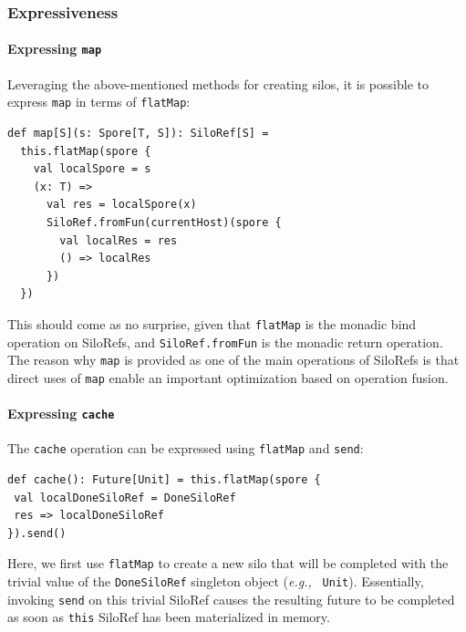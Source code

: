 \documentclass[preprint]{sigplanconf}
\theoremstyle{definition}
\theoremstyle{definition}
\newcommand{\eg}{{\em e.g.,~}}
\begin{document}
\subsubsection{Expressiveness}
\label{sec:expr}

\paragraph{Expressing \texttt{map}}

Leveraging the above-mentioned methods for creating silos, it is possible to
express \verb|map| in terms of \verb|flatMap|:

\begin{lstlisting}
def map[S](s: Spore[T, S]): SiloRef[S] =
  this.flatMap(spore {
    val localSpore = s
    (x: T) =>
      val res = localSpore(x)
      SiloRef.fromFun(currentHost)(spore {
        val localRes = res
        () => localRes
      })
  })
\end{lstlisting}
\noindent
This should come as no surprise, given that \verb|flatMap| is the monadic bind
operation on SiloRefs, and \verb|SiloRef.fromFun| is the monadic return
operation. The reason why \verb|map| is provided as one of the main operations
of SiloRefs is that direct uses of \verb|map| enable an important optimization
based on operation fusion.


\paragraph{Expressing \texttt{cache}}

The \verb|cache| operation can be expressed using \verb|flatMap| and
\verb|send|:

\begin{lstlisting}
def cache(): Future[Unit] = this.flatMap(spore {
 val localDoneSiloRef = DoneSiloRef
 res => localDoneSiloRef
}).send()

\end{lstlisting}
\noindent
Here, we first use \verb|flatMap| to create a new silo that will be completed 
with the trivial value of the \verb|DoneSiloRef| singleton object (\eg 
\verb|Unit|).  Essentially, invoking \verb|send| on this 
trivial SiloRef causes the resulting future to be completed as soon as 
\verb|this| SiloRef has been materialized in memory.
\end{document}
